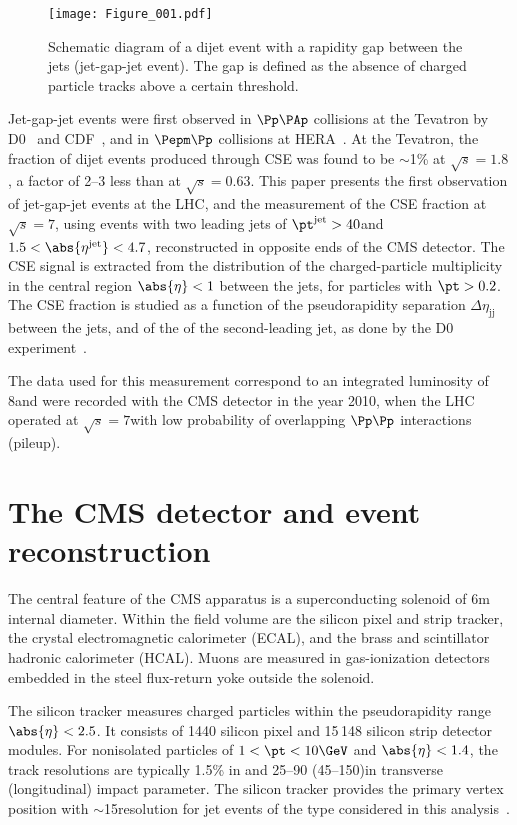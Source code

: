 \documentclass[11pt,twoside,a4paper,cmspaper,final,collab]{cms-tdr}
\begin{document}
\begin{figure}
\centering
\texttt{[image: Figure\_001.pdf]}
\caption{Schematic diagram of a dijet event with a rapidity gap between the jets (jet-gap-jet event). The gap is defined as the absence of charged particle tracks above a certain \pt threshold.}
\label{fig-jgj}
\end{figure}

Jet-gap-jet events were first observed in $\Pp\PAp$ collisions at the Tevatron by D0~\cite{d01,d02,d03} and CDF~\cite{cdf1,cdf2,cdf3}, and in $\Pepm\Pp$ collisions at HERA~\cite{zeus,h1}. At the Tevatron, the fraction of dijet events produced through CSE was found to be $\sim$1\% at $\sqrt{s}=1.8$\TeV,
a factor of 2--3 less than at $\sqrt{s}=0.63$\TeV. This paper presents the first observation of jet-gap-jet events at the LHC, and the measurement of the CSE fraction at $\sqrt{s}=7$\TeV, using events with two leading jets of $\pt^{\text{jet}}>40$\GeV and $1.5<\abs{\eta^{\text{jet}}}<4.7$, reconstructed in opposite ends of the CMS detector. The CSE signal is extracted from the distribution of the charged-particle multiplicity in the central region $\abs{\eta}<1$ between the jets, for particles with $\pt>0.2$\GeV. The CSE fraction is studied as a function of the pseudorapidity separation $\Delta\eta_\mathrm{jj}$ between the jets, and of the \pt of the second-leading jet, as done by the D0 experiment~\cite{d03}.

The data used for this measurement correspond to an integrated luminosity of 8\pbinv and were recorded with the CMS detector in the year 2010, when the LHC operated at $\sqrt{s}=7$\TeV with low probability of overlapping $\Pp\Pp$ interactions (pileup).

\section{The CMS detector and event reconstruction}

The central feature of the CMS apparatus is a superconducting solenoid of 6\unit{m} internal diameter. Within the field volume are the silicon pixel and strip tracker, the crystal electromagnetic calorimeter (ECAL), and the brass and scintillator hadronic calorimeter (HCAL). Muons are measured in gas-ionization detectors embedded in the steel flux-return yoke outside the solenoid.

The silicon tracker measures charged particles within the pseudorapidity range $\abs{\eta} < 2.5$. It consists of 1440 silicon pixel and 15\,148 silicon strip detector modules. For nonisolated particles of $1 < \pt < 10\GeV$ and $\abs{\eta} < 1.4$, the track resolutions are typically 1.5\% in \pt and 25--90 (45--150)\mum in transverse (longitudinal) impact parameter.
The silicon tracker provides the primary vertex position with $\sim$15\mum resolution for jet events of the type considered in this analysis~\cite{TRK-11-001}.
\end{document}
